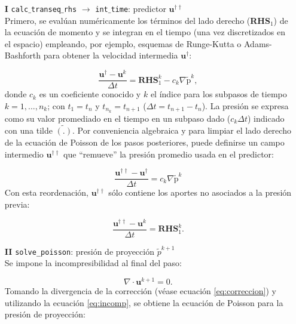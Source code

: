 \begin{enumerate}
\item[\textbf{I}] \texttt{calc$\_$transeq$\_$rhs} $\rightarrow$ \texttt{int$\_$time}: predictor $\mathbf{u}^{\dagger \dagger}$ \\
Primero, se evalúan numéricamente los términos del lado derecho (\textbf{RHS}$_1$) de la ecuación de momento y se integran en el tiempo (una vez discretizados en el espacio) empleando, por ejemplo, esquemas de Runge-Kutta o Adams-Bashforth para obtener la velocidad intermedia $\mathbf{u}^{\dagger}$:

\begin{equation}
\frac{\mathbf{u}^{\dagger} - \mathbf{u}^k}{\Delta t} = \textbf{RHS}_1^k - c_k \nabla \widetilde{\text{p}}^k , 
\end{equation}
donde $c_k$ es un coeficiente conocido y $k$ el índice para los subpasos de tiempo \linebreak $k=1,...,n_k$; con $t_1=t_n$ y $t_{n_k}=t_{n+1}$ ($\Delta t = t_{n+1} - t_{n}$). La presión se expresa como su valor promediado en el tiempo en un subpaso dado ($c_k \Delta t$) indicado con una tilde $\widetilde{(\text{.})}$. Por conveniencia algebraica y para limpiar el lado derecho de la ecuación de Poisson de los pasos posteriores, puede definirse un campo intermedio $\mathbf{u}^{\dagger \dagger}$ que ``remueve'' la presión promedio usada en el predictor:

\begin{equation}
\frac{\mathbf{u}^{\dagger \dagger} - \mathbf{u}^{\dagger}}{\Delta t} = c_k \nabla \widetilde{\text{p}}^k  
\end{equation}
Con esta reordenación, $\mathbf{u}^{\dagger \dagger}$ sólo contiene los aportes no asociados a la presión previa:

\begin{equation}
\frac{\mathbf{u}^{\dagger \dagger} - \mathbf{u}^{k}}{\Delta t} = \textbf{RHS}_1^k \text{.}  
\end{equation}

\item[\textbf{II}] \texttt{solve\_poisson}: presión de proyección $\widetilde{p}^{k+1}$ \\
Se impone la incompresibilidad al final del paso:
	
\begin{equation}
\nabla \cdot \mathbf{u}^{k+1} = 0.
\label{eq:incomp}
\end{equation}
Tomando la divergencia de la corrección (véase ecuación \ref{eq:correccion}) y utilizando la ecuación \ref{eq:incomp}, se obtiene la ecuación de Poisson para la presión de proyección:


\end{enumerate}
